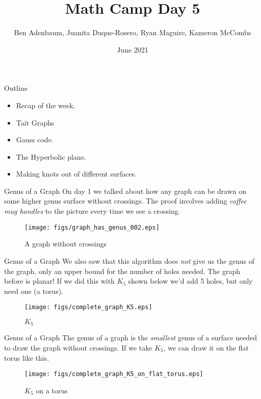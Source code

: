 \documentclass{beamer}
\title{Math Camp Day 5}
\author{Ben Adenbaum, Juanita Duque-Rosero, Ryan Maguire, Kameron McCombs}
\date{June 2021}
\begin{document}
    \maketitle
    \begin{frame}{Outline}
        \begin{itemize}
            \item Recap of the week.
            \item Tait Graphs
            \item Gauss code.
            \item The Hyperbolic plane.
            \item Making knots out of different surfaces.
        \end{itemize}
    \end{frame}
    \begin{frame}{Genus of a Graph}
        On day 1 we talked about how any graph can be drawn on some higher
        genus surface without crossings. The proof involves adding
        \textit{coffee mug handles} to the picture every time we see a crossing.
        \begin{figure}
            \centering
            \texttt{[image: figs/graph\_has\_genus\_002.eps]}
            \caption{A graph without crossings}
            \label{fig:graph_has_genus_002}
        \end{figure}
    \end{frame}
    \begin{frame}{Genus of a Graph}
        We also saw that this algorithm does \textit{not} give
        us the genus of the graph, only an upper bound for the number of
        holes needed. The graph before is planar! If we did this with $K_{5}$
        shown below we'd add 5 holes, but only need one (a torus).
        \begin{figure}
            \centering
            \texttt{[image: figs/complete\_graph\_K5.eps]}
            \caption{$K_{5}$}
            \label{fig:complete_graph_K5}
        \end{figure}
    \end{frame}
    \begin{frame}{Genus of a Graph}
        The genus of a graph is the \textit{smallest} genus of a surface needed
        to draw the graph without crossings. If we take $K_{5}$, we can draw it on
        the flat torus like this.
        \begin{figure}
            \centering
            \texttt{[image: figs/complete\_graph\_K5\_on\_flat\_torus.eps]}
            \caption{$K_{5}$ on a torus}
            \label{fig:complete_graph_K5_on_flat_torus}
        \end{figure}
    \end{frame}
\end{document}
